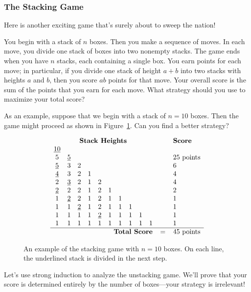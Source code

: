 \subsubsection{The Stacking Game}

Here is another exciting game that's surely about to sweep the
nation!

You begin with a stack of $n$ boxes.  Then you
make a sequence of moves.  In each move, you divide one stack of boxes
into two nonempty stacks.  The game ends when you have $n$ stacks, each
containing a single box.  You earn points for each move; in particular, if
you divide one stack of height $a + b$ into two stacks with heights $a$
and $b$, then you score $ab$ points for that move.  Your overall score is
the sum of the points that you earn for each move.  What strategy should
you use to maximize your total score?

As an example, suppose that we begin with a stack of $n = 10$ boxes.
Then the game might proceed as shown in Figure~\ref{fig:stacking-10}.
Can you find a better strategy?
\begin{figure}%
\[
\begin{array}{cccccccccccl}
\multicolumn{10}{c}{\textbf{Stack Heights}} & \quad & \textbf{Score} \\
\underline{10}&&&&&&&&& && \\
5&\underline{5}&&&&&&&& && 25 \text{ points} \\
\underline{5}&3&2&&&&&&& && 6 \\
\underline{4}&3&2&1&&&&&& && 4 \\
2&\underline{3}&2&1&2&&&&& && 4 \\
\underline{2}&2&2&1&2&1&&&& && 2 \\
1&\underline{2}&2&1&2&1&1&&& && 1 \\
1&1&\underline{2}&1&2&1&1&1&& && 1 \\
1&1&1&1&\underline{2}&1&1&1&1& && 1 \\
1&1&1&1&1&1&1&1&1&1 && 1 \\ \hline
\multicolumn{10}{r}{\textbf{Total Score}} & = & 45 \text{ points}
\end{array}
\]
\caption{An example of the stacking game with $n = 10$ boxes.  On each
line, the underlined stack is divided in the next step.}
\label{fig:stacking-10}
\end{figure}

Let's use strong induction to analyze the unstacking game.  We'll prove
that your score is determined entirely by the number of boxes---your
strategy is irrelevant!

